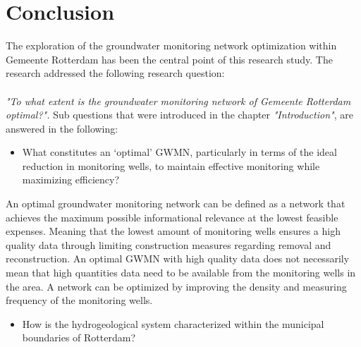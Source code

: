 \chapter{Conclusion}
\label{chapter:conclusion}

The exploration of the groundwater monitoring network optimization within Gemeente Rotterdam has been the central point of this research study. The research addressed the following research question:\\
\\
\textit{"To what extent is the groundwater monitoring network of Gemeente Rotterdam optimal?".}
\newline
Sub questions that were introduced in the chapter \textit{"Introduction"}, are answered in the following: 

\newline
\begin{itemize}
    \item What constitutes an ‘optimal’ GWMN, particularly in terms of the ideal reduction in monitoring wells, to maintain effective monitoring while maximizing efficiency?
\end{itemize}

An optimal groundwater monitoring network can be defined as a network that achieves the maximum possible informational relevance at the lowest feasible expenses. Meaning that the lowest amount of monitoring wells ensures a high quality data through limiting construction measures regarding removal and reconstruction. An optimal GWMN with high quality data does not necessarily mean that high quantities data need to be available from the monitoring wells in the area. A network can be optimized by improving the density and measuring frequency of the monitoring wells.

\begin{itemize}
    \item How is the hydrogeological system characterized within the municipal boundaries of Rotterdam?

\end{itemize}


